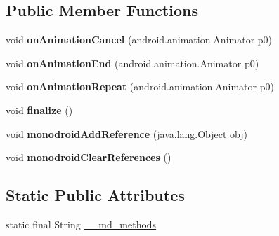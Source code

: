 \subsection*{Public Member Functions}
\begin{DoxyCompactItemize}
\item 
\mbox{\label{classmd5b60ffeb829f638581ab2bb9b1a7f4f3f_1_1GenericAnimatorListener_ab745db9d1bbb0cb04441a727772e9cf0}} 
void {\bfseries on\+Animation\+Cancel} (android.\+animation.\+Animator p0)
\item 
\mbox{\label{classmd5b60ffeb829f638581ab2bb9b1a7f4f3f_1_1GenericAnimatorListener_ace339af29a5453d7f7cc1f5dcefd6248}} 
void {\bfseries on\+Animation\+End} (android.\+animation.\+Animator p0)
\item 
\mbox{\label{classmd5b60ffeb829f638581ab2bb9b1a7f4f3f_1_1GenericAnimatorListener_ae1933b559083185b38a40651ea936d48}} 
void {\bfseries on\+Animation\+Repeat} (android.\+animation.\+Animator p0)
\item 
\mbox{\label{classmd5b60ffeb829f638581ab2bb9b1a7f4f3f_1_1GenericAnimatorListener_a5498cbcf56e1098c0a13447afde9ae4a}} 
void {\bfseries finalize} ()
\item 
\mbox{\label{classmd5b60ffeb829f638581ab2bb9b1a7f4f3f_1_1GenericAnimatorListener_a613f7bd903d31fdcf64c5b8fff2e0ad4}} 
void {\bfseries monodroid\+Add\+Reference} (java.\+lang.\+Object obj)
\item 
\mbox{\label{classmd5b60ffeb829f638581ab2bb9b1a7f4f3f_1_1GenericAnimatorListener_a876788d7a8833b3f98d2609c2b63e16d}} 
void {\bfseries monodroid\+Clear\+References} ()
\end{DoxyCompactItemize}
\subsection*{Static Public Attributes}
\begin{DoxyCompactItemize}
\item 
static final String \hyperlink{classmd5b60ffeb829f638581ab2bb9b1a7f4f3f_1_1GenericAnimatorListener_a2cc0ec65c1c849bc5bff6baeb2599d15}{\+\_\+\+\_\+md\+\_\+methods}
\end{DoxyCompactItemize}
